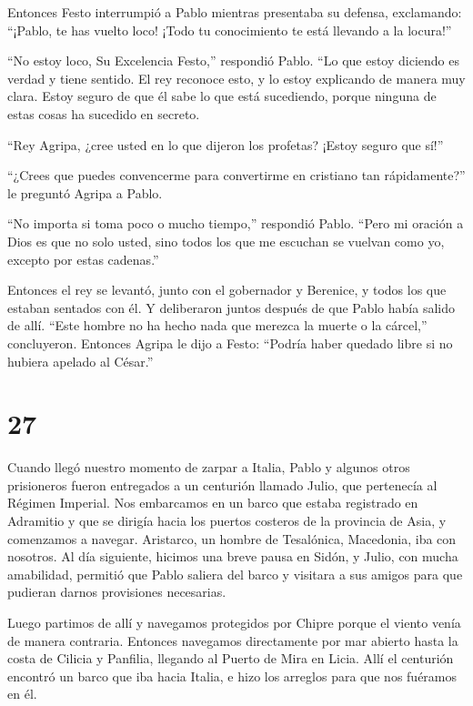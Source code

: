  Entonces Festo interrumpió a Pablo mientras presentaba su
defensa, exclamando: ``¡Pablo, te has vuelto loco! ¡Todo tu conocimiento
te está llevando a la locura!''

 ``No estoy loco, Su Excelencia Festo,'' respondió Pablo.
``Lo que estoy diciendo es verdad y tiene sentido.  El rey
reconoce esto, y lo estoy explicando de manera muy clara. Estoy seguro
de que él sabe lo que está sucediendo, porque ninguna de estas cosas ha
sucedido en secreto.

 ``Rey Agripa, ¿cree usted en lo que dijeron los profetas?
¡Estoy seguro que sí!''

 ``¿Crees que puedes convencerme para convertirme en
cristiano tan rápidamente?'' le preguntó Agripa a Pablo.

 ``No importa si toma poco o mucho tiempo,'' respondió
Pablo. ``Pero mi oración a Dios es que no solo usted, sino todos los que
me escuchan se vuelvan como yo, excepto por estas cadenas.''

 Entonces el rey se levantó, junto con el gobernador y
Berenice, y todos los que estaban sentados con él.  Y
deliberaron juntos después de que Pablo había salido de allí. ``Este
hombre no ha hecho nada que merezca la muerte o la cárcel,''
concluyeron.  Entonces Agripa le dijo a Festo: ``Podría
haber quedado libre si no hubiera apelado al César.''

\hypertarget{section-26}{%
\section{27}\label{section-26}}

 Cuando llegó nuestro momento de zarpar a Italia, Pablo y
algunos otros prisioneros fueron entregados a un centurión llamado
Julio, que pertenecía al Régimen Imperial.  Nos embarcamos
en un barco que estaba registrado en Adramitio y que se dirigía hacia
los puertos costeros de la provincia de Asia, y comenzamos a navegar.
Aristarco, un hombre de Tesalónica, Macedonia, iba con nosotros.
 Al día siguiente, hicimos una breve pausa en Sidón, y
Julio, con mucha amabilidad, permitió que Pablo saliera del barco y
visitara a sus amigos para que pudieran darnos provisiones necesarias.

 Luego partimos de allí y navegamos protegidos por Chipre
porque el viento venía de manera contraria.  Entonces
navegamos directamente por mar abierto hasta la costa de Cilicia y
Panfilia, llegando al Puerto de Mira en Licia.  Allí el
centurión encontró un barco que iba hacia Italia, e hizo los arreglos
para que nos fuéramos en él.

